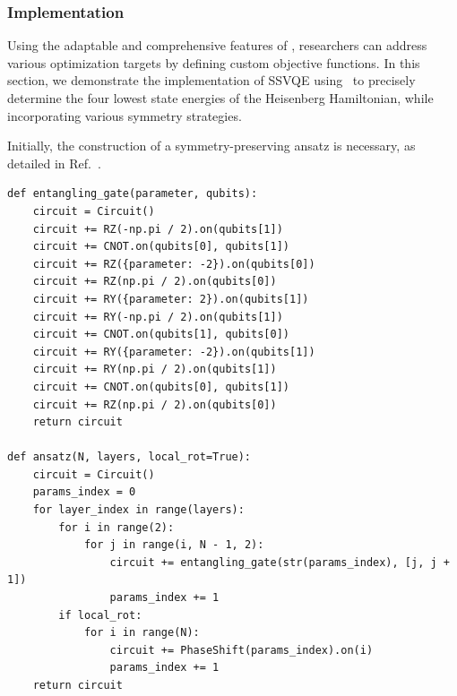 \subsubsection{Implementation}
Using the adaptable and comprehensive features of \MindQuantum, researchers can address various optimization targets by defining custom objective functions. In this section, we demonstrate the implementation of SSVQE using \MindQuantum\ to precisely determine the four lowest state energies of the Heisenberg Hamiltonian, while incorporating various symmetry strategies.

Initially, the construction of a symmetry-preserving ansatz is necessary, as detailed in Ref.~\cite{Lyu2023symmetryenhanced}.
\begin{lstlisting}
def entangling_gate(parameter, qubits):
    circuit = Circuit()
    circuit += RZ(-np.pi / 2).on(qubits[1])
    circuit += CNOT.on(qubits[0], qubits[1])
    circuit += RZ({parameter: -2}).on(qubits[0])
    circuit += RZ(np.pi / 2).on(qubits[0])
    circuit += RY({parameter: 2}).on(qubits[1])
    circuit += RY(-np.pi / 2).on(qubits[1])
    circuit += CNOT.on(qubits[1], qubits[0])
    circuit += RY({parameter: -2}).on(qubits[1])
    circuit += RY(np.pi / 2).on(qubits[1])
    circuit += CNOT.on(qubits[0], qubits[1])
    circuit += RZ(np.pi / 2).on(qubits[0])
    return circuit

def ansatz(N, layers, local_rot=True):
    circuit = Circuit()
    params_index = 0
    for layer_index in range(layers):
        for i in range(2):
            for j in range(i, N - 1, 2):
                circuit += entangling_gate(str(params_index), [j, j + 1])
                params_index += 1
        if local_rot:
            for i in range(N):
                circuit += PhaseShift(params_index).on(i)
                params_index += 1
    return circuit
\end{lstlisting}

